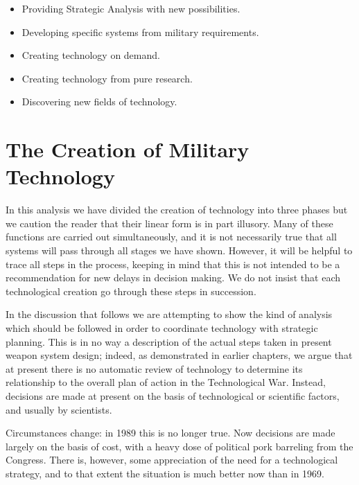 \begin{mdframed}[backgroundcolor=ApricotWhite, frametitle={CHART 9: Duties of the Technological Community}]
    \begin{itemize}
        \item Providing Strategic Analysis with new possibilities.
        \item Developing specific systems from military requirements.
        \item Creating technology on demand.
        \item Creating technology from pure research.
        \item Discovering new fields of technology.
    \end{itemize}
\end{mdframed}

\section{The Creation of Military Technology}

In this analysis we have divided the creation of technology into three phases but we caution the reader that their linear form is in part illusory. Many of these functions are carried out simultaneously, and it is not necessarily true that all systems will pass through all stages we have shown. However, it will be helpful to trace all steps in the process, keeping in mind that this is not intended to be a recommendation for new delays in decision making. We do not insist that each technological creation go through these steps in succession.

In the discussion that follows we are attempting to show the kind of analysis which should be followed in order to coordinate technology with strategic planning. This is in no way a description of the actual steps taken in present weapon system design; indeed, as demonstrated in earlier chapters, we argue that at present there is no automatic review of technology to determine its relationship to the overall plan of action in the Technological War. Instead, decisions are made at present on the basis of technological or scientific factors, and usually by scientists.

\begin{mdframed}[backgroundcolor=black!10]
Circumstances change: in 1989 this is no longer true. Now decisions are made largely on the basis of cost, with a heavy dose of political pork barreling from the Congress. There is, however, some appreciation of the need for a technological strategy, and to that extent the situation is much better now than in 1969.
\end{mdframed}

